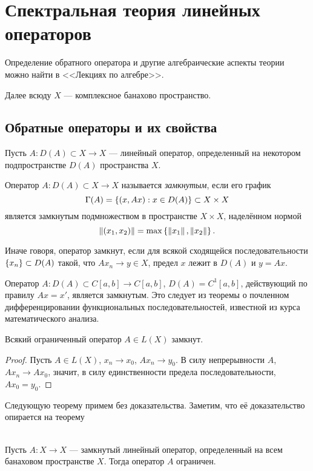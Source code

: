\section{Спектральная теория линейных операторов}
Определение обратного оператора и другие алгебраические аспекты теории можно найти
в <<Лекциях по алгебре>>.

Далее всюду $X$ --- комплексное банахово пространство.

\subsection{Обратные операторы и их свойства}
Пусть $A \colon D(A) \subset X \to X$ --- линейный оператор, определенный на некотором
подпространстве $D(A)$ пространства $X$.

\begin{definition}
    Оператор $A \colon D(A) \subset X \to X$ называется \emph{замкнутым}, если его график
    \[ \Gamma(A) = \left\{(x, Ax) : x \in D(A)\right\} \subset X \times X \]
    является замкнутым подмножеством в пространстве $X \times X$, наделённом нормой
    \[ \left\|(x_1, x_2)\right\| = \max\left\{\left\|x_1\right\|, \left\|x_2\right\|\right\}. \]
\end{definition}

Иначе говоря, оператор замкнут, 
если для всякой сходящейся последовательности $\left\{x_n\right\} \subset D(A)$ такой, что
$Ax_n \to y \in X$, предел $x$ лежит в $D(A)$ и $y = Ax$.

\begin{example}
    Оператор $A \colon D(A) \subset C[a,b] \to C[a,b]$, $D(A) = C^1[a,b]$, действующий по правилу
    $Ax = x'$, является замкнутым. Это следует из теоремы о почленном дифференцировании
    функциональных последовательностей, известной из курса математического анализа.
\end{example}

\begin{theorem}
    Всякий ограниченный оператор $A \in L(X)$ замкнут.
\end{theorem}

\begin{proof}
    Пусть $A \in L(X)$, $x_n \to x_0$, $Ax_n \to y_0$. В силу непрерывности $A$, $Ax_n \to Ax_0$, значит, в силу единственности предела последовательности, $Ax_0 = y_0$.
\end{proof}

Следующую теорему примем без доказательства. Заметим, что её доказательство опирается
на теорему
\begin{theorem}\hfill\\
    \indent Пусть $A \colon X \to X$ --- замкнутый линейный оператор, определенный на всем
    банаховом пространстве $X$. Тогда оператор $A$ ограничен.
\end{theorem}

